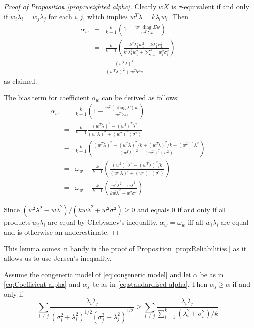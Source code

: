 \documentclass[twoside]{article}
\DeclareMathOperator{\diag}{diag}
\renewcommand{\sqrt}[1]{{(#1)^{1/2}}}
\begin{document}
\begin{proof}[Proof of Proposition \ref{prop:weighted alpha}]
\label{proof:weighted alpha}Clearly $wX$ is $\tau$-equivalent
if and only if $w_{i}\lambda_{i}=w_{j}\lambda_{j}$ for each $i,j$,
which implies $w^{T}\lambda=k\lambda_{i}w_{i}$. Then
\begin{eqnarray*}
\alpha_{w} & = & \frac{k}{k-1}\left(1-\frac{w^{T}\diag\Sigma w}{w^{T}\Sigma w}\right)\\
 & = & \frac{k}{k-1}\left(\frac{k^{2}\lambda_{1}^{2}w_{1}^{2}-k\lambda_{1}^{2}w_{1}^{2}}{k^{2}\lambda_{1}^{2}w_{1}^{2}+\sum_{i=1}^{k}w_{i}^{2}\sigma_{i}^{2}}\right)\\
 & = & \frac{(w^{T}\lambda)^{2}}{(w^{T}\lambda)^{2}+w^{T}\Psi w}
\end{eqnarray*}
as claimed.

The bias term for coefficient $\alpha_w$ can be derived as follows:
\begin{eqnarray*}
\alpha_{w} & = & \frac{k}{k-1}\left(1-\frac{w^{T}(\diag\Sigma)w}{w^{T}\Sigma w}\right)\\
 & = & \frac{k}{k-1}\frac{(w^{T}\lambda)^{2}-(w^{2})^{T}\lambda^{2}}{(w^{T}\lambda)^{2}+(w^{2})^{T}(\sigma^{2})}\\
 & = & \frac{k}{k-1}\left(\frac{(w^{T}\lambda)^{2}-(w^{T}\lambda)^{2}/k+(w^{T}\lambda)^{2}/k-(w^{2})^{T}\lambda^{2}}{(w^{T}\lambda)^{2}+(w^{2})^{T}(\sigma^{2})}\right)\\
 & = & \omega_{w}-\frac{k}{k-1}\left(\frac{(w^{2})^{T}\lambda^{2}-(w^{T}\lambda)^{2}/k}{(w^{T}\lambda)^{2}+(w^{2})^{T}(\sigma^{2})}\right)\\
 & = & \omega_{w}-\frac{k}{k-1}\left(\frac{\overline{w^{2}\lambda^{2}}-\overline{w\lambda}^{2}}{k\overline{w\lambda}^{2}+\overline{w^{2}\sigma^{2}}}\right)
\end{eqnarray*}

Since $(\overline{w^{2}\lambda^{2}}-\overline{w\lambda}^{2})/(k\overline{w\lambda}^{2}+\overline{w^{2}\sigma^{2}})\geq0$
and equals $0$ if and only if all products $w_i\lambda_i$ are equal by Chebyshev's inequality, $\alpha_w=\omega_w$
iff all $w_i\lambda_i$ are equal and is otherwise an underestimate. 


\end{proof}


This lemma comes in handy in the proof of Proposition \ref{prop:Reliabilities.} as it allows us to use Jensen's inequality.

\begin{lem}
Assume the congeneric model of \eqref{eq:congeneric model} and let $\alpha$ be as in \eqref{eq:Coefficient alpha} and $\alpha_s$ be as in \eqref{eq:standardized alpha}. Then $\alpha_{s}\geq\alpha$
if and only if
\begin{equation}
\label{eq:alpha_s_alpha_inequality}
\sum_{i\neq j}\frac{\lambda_{i}\lambda_{j}}{\sqrt{\sigma_{i}^{2}+\lambda_{i}^{2}}\sqrt{\sigma_j^{2}+\lambda_{j}^{2}}} 
\geq
\sum_{i\neq j}\frac{\lambda_{i}\lambda_{j}}{\sum_{i=1}^{k}\left(\lambda_{i}^{2}+\sigma_{i}^{2}\right)/k}
\end{equation}
\end{lem}
\end{document}
